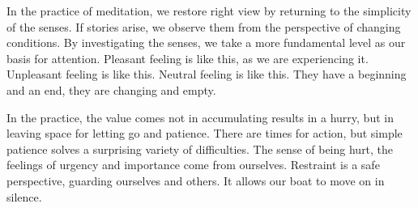 In the practice of meditation, we restore right view by returning to the
simplicity of the senses. If stories arise, we observe them from the
perspective of changing conditions. By investigating the senses, we take
a more fundamental level as our basis for attention. Pleasant feeling is
like this, as we are experiencing it. Unpleasant feeling is like this.
Neutral feeling is like this. They have a beginning and an end, they are
changing and empty.

In the practice, the value comes not in accumulating results in a hurry,
but in leaving space for letting go and patience. There are times for
action, but simple patience solves a surprising variety of difficulties.
The sense of being hurt, the feelings of urgency and importance come
from ourselves. Restraint is a safe perspective, guarding ourselves and
others. It allows our boat to move on in silence.
